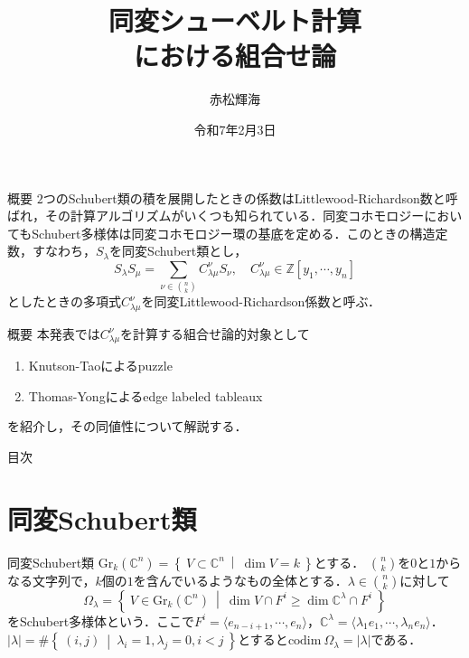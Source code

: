 \documentclass[unicode,12pt]{beamer}%
\title{同変シューベルト計算\\における組合せ論}
\author{赤松輝海}
\date{令和7年2月3日}
\institute{京都大学大学院理学研究科数学・数理解析専攻修士課程}
\theoremstyle{definition}
\theoremstyle{example}
\newcommand{\integer}{\mathbb{Z}}
\newcommand{\complex}{\mathbb{C}}
\newcommand{\set}[2]{\left\{\:#1\:\middle|\:#2\:\right\}}
\newcommand{\codim}[1]{\text{codim}\:#1}
\begin{document}
\begin{frame}
  \titlepage
\end{frame}

\begin{frame}{概要}
  $2$つのSchubert類の積を展開したときの係数はLittlewood-Richardson数と呼ばれ，その計算アルゴリズムがいくつも知られている．同変コホモロジーにおいてもSchubert多様体は同変コホモロジー環の基底を定める．このときの構造定数，すなわち，$S_\lambda$を同変Schubert類とし，
  \[
  S_\lambda S_\mu = \sum_{\nu\in\binom{n}{k}}C^\nu_{\lambda\mu}S_\nu,\quad C^\nu_{\lambda\mu}\in\integer[y_1,\cdots,y_n]
  \]
  としたときの多項式$C^\nu_{\lambda\mu}$を同変Littlewood-Richardson係数と呼ぶ．
\end{frame}

\begin{frame}{概要}
  本発表では$C^\nu_{\lambda\mu}$を計算する組合せ論的対象として
  \begin{enumerate}
    \item Knutson-Taoによるpuzzle
    \item Thomas-Yongによるedge labeled tableaux
  \end{enumerate}
  を紹介し，その同値性について解説する．
\end{frame}

\begin{frame}{目次}
  \tableofcontents
\end{frame}




\section[]{同変Schubert類}

\begin{frame}{同変Schubert類}
  $\text{Gr}_k(\complex^n)=\set{V\subset\complex^n}{\dim V = k}$とする．
  $\binom{n}{k}$を$0$と$1$からなる文字列で，$k$個の$1$を含んでいるようなもの全体とする．$\lambda\in\binom{n}{k}$に対して
  \[
  \Omega_\lambda = \set{V\in \text{Gr}_k(\complex^n)}{\dim V\cap F^i \geq \dim \complex^\lambda\cap F^i}
  \]
  をSchubert多様体という．ここで$F^i = \langle e_{n-i+1},\cdots,e_n \rangle$，$\complex^\lambda = \langle \lambda_1e_1,\cdots,\lambda_ne_n \rangle$．$|\lambda| = \#\set{(i, j)}{\lambda_i = 1,\lambda_j = 0, i < j}$とすると$\codim\Omega_\lambda=|\lambda|$である．
\end{frame}
\end{document}
